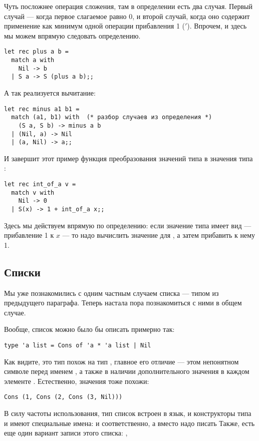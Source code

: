 Чуть посложнее операция сложения, там в определении есть два случая.
Первый случай --- когда первое слагаемое равно 0, и второй случай, когда
оно содержит применение как минимум одной операции прибавления 1 ($'$). 
Впрочем, и здесь мы можем впрямую следовать определению.
\begin{verbatim}
let rec plus a b = 
  match a with
    Nil -> b
  | S a -> S (plus a b);;
\end{verbatim}

А так реализуется вычитание:
\begin{verbatim}
let rec minus a1 b1 = 
  match (a1, b1) with  (* разбор случаев из определения *)
    (S a, S b) -> minus a b
  | (Nil, a) -> Nil
  | (a, Nil) -> a;;
\end{verbatim}

И завершит этот пример функция преобразования значений типа  в 
значения типа :

\begin{verbatim}
let rec int_of_a v =
  match v with
    Nil -> 0
  | S(x) -> 1 + int_of_a x;;
\end{verbatim}

Здесь мы действуем впрямую по определению: если значение типа 
имеет вид  --- прибавление 1 к $x$ --- то надо вычислить значение
для , а затем прибавить к нему 1.

\subsection{Списки}

Мы уже познакомились с одним частным случаем списка --- типом  из 
предыдущего
параграфа. Теперь настала пора познакомиться с ними в общем случае.

Вообще, список можно было бы описать примерно так:
\begin{verbatim}
type 'a list = Cons of 'a * 'a list | Nil
\end{verbatim}

Как видите, это тип похож на тип , главное его отличие --- этом
непонятном символе  перед именем , а также в наличии 
дополнительного значения в каждом элементе .
Естественно, значения тоже похожи:
\begin{verbatim}
Cons (1, Cons (2, Cons (3, Nil)))
\end{verbatim}

В силу частоты использования, тип список встроен в язык,
и конструкторы типа  и  имеют специальные
имена: \s{::} и \s{[]} соответственно, а вместо 
надо писать 
Также, есть еще один вариант записи этого списка:
\s{[1;2;3]}, 


